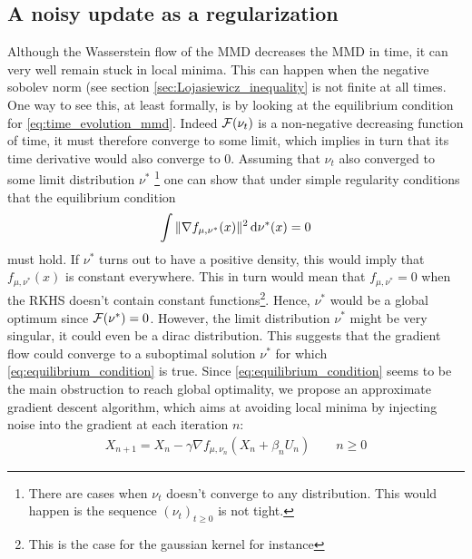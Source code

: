 

\subsection{A noisy update as a regularization}\label{sec:noisy_flow}

Although the Wasserstein flow of the MMD decreases the MMD in time, it can very well
 remain stuck in local minima. This can happen when the negative sobolev norm (see section \cref{sec:Lojasiewicz_inequality} is not finite at all times. One way to see this, at least formally, is by looking at the equilibrium condition for \cref{eq:time_evolution_mmd}.
Indeed ${{\mathcal F}}(\nu_t)$ is a non-negative decreasing function of time, it must therefore converge to some limit, which implies in turn that its time derivative would also converge to $0$. Assuming that $\nu_t$ also converged to some limit distribution $\nu^{*}$
\footnote{There are cases when $\nu_t$ doesn't converge to any distribution. This would happen is the sequence $(\nu_t)_{t\geq 0}$ is not tight.} 
one can show that under simple regularity conditions that the equilibrium condition
\begin{align}\label{eq:equilibrium_condition}
	\int \Vert \nabla f_{\mu,\nu^{*}}(x)\Vert^2 \mathop{}\!\mathrm{d} \nu^{*}(x) =0  
\end{align}
must hold. If $\nu^*$ turns out to have a positive density, this would imply that $f_{\mu,\nu^{*}}(x)$ is constant everywhere. This in turn would mean that $f_{\mu,\nu^{*}}=0$ when the RKHS doesn't contain constant functions\footnote{This is the case for the gaussian kernel for instance}. Hence, $\nu^*$ would be a global optimum since ${{\mathcal F}}(\nu^{*})=0$. However, the limit distribution $\nu^*$  might be very singular, it could even be a dirac distribution.   This suggests that the gradient flow could converge to a suboptimal solution $\nu^*$ for which \cref{eq:equilibrium_condition} is true. 
Since \cref{eq:equilibrium_condition} seems to be the main obstruction to reach global optimality, we propose an approximate gradient descent algorithm, which aims at avoiding local minima by injecting noise into the gradient at each iteration $n$:  
\begin{align}\label{eq:discretized_noisy_flow}
	X_{n+1} = X_{n} -\gamma \nabla f_{\mu,\nu_n}(X_n+ \beta_n U_n) \qquad n\geq 0
\end{align}
